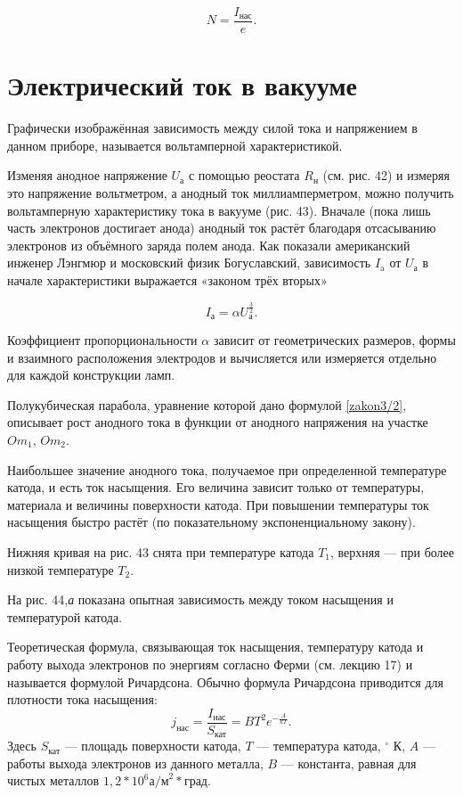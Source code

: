 \documentclass[a4paper,10pt]{book}
\begin{document}
\begin{equation}
N = \frac{I_\text{нас}}{e}.\nonumber
\end{equation}

\section{Электрический ток в вакууме}
Графически изображённая зависимость между силой тока и напряжением в данном приборе, называется вольтамперной характеристикой.

Изменяя анодное напряжение $U_\text{а}$ с помощью реостата $R_\text{н}$ (см. рис. 42) и измеряя это напряжение вольтметром, а анодный ток миллиамперметром, можно получить вольтамперную характеристику тока в вакууме (рис. 43). Вначале (пока лишь часть электронов достигает анода) анодный ток растёт благодаря отсасыванию электронов из объёмного заряда полем анода. Как показали американский инженер Лэнгмюр и московский физик Богуславский, зависимость $I_\text{a}$ от $U_\text{а}$ в начале характеристики выражается «законом трёх вторых»

\begin{equation}\label{zakon3/2}
I_\text{а} = \alpha U_\text{а}^{\frac{3}{2}}.
\end{equation}

Коэффициент пропорциональности $\alpha$ зависит от геометрических размеров, формы и взаимного расположения электродов и вычисляется или измеряется отдельно для каждой конструкции ламп.

Полукубическая парабола, уравнение которой дано формулой \ref{zakon3/2}, описывает рост анодного тока в функции от анодного напряжения на участке $Om_1$, $Om_2$.

Наибольшее значение анодного тока, получаемое при определенной температуре катода, и есть ток насыщения. Его величина зависит только от температуры, материала и величины поверхности катода. При повышении температуры ток насыщения быстро растёт (по показательному экспоненциальному закону).

Нижняя кривая на рис. 43 снята при температуре катода $T_1$, верхняя — при более низкой температуре $T_2$.

На рис. 44,\textit{а} показана опытная зависимость между током насыщения и температурой катода.

Теоретическая формула, связывающая ток насыщения, температуру катода и работу выхода электронов по энергиям согласно Ферми (см. лекцию 17) и называется формулой Ричардсона. Обычно формула Ричардсона приводится для плотности тока насыщения:
\begin{equation}
j_\text{нас} = \frac{I_\text{нас}}{S_\text{кат}} = BT^{2}e^{-\frac{A}{kT}}.
\end{equation}
Здесь $S_\text{кат}$ — площадь поверхности катода, $T$ — температура катода, $^{\circ}\text{ К}$, $A$ — работы выхода электронов из данного металла, $B$ — константа, равная для чистых металлов $1,2*10^{6} \text{а/м}^{2}*\text{град}$.
\end{document}
